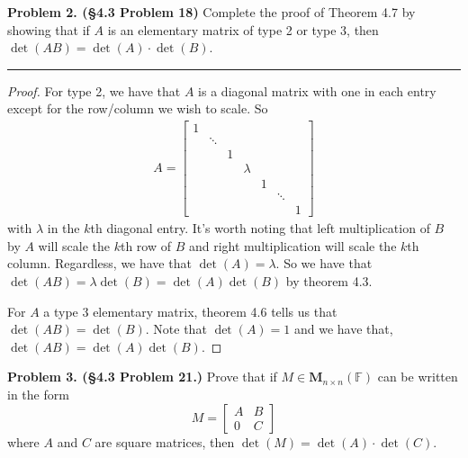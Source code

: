 \documentclass[leqno]{article}
\theoremstyle{nonumberplain}
\newtheorem{proof}{Proof}
\begin{document}
\pagebreak



\noindent\textbf{Problem 2. (\S 4.3 Problem 18)} Complete the proof of Theorem 4.7 by showing that if $A$ is an elementary matrix of type 2 or type 3, then $\det(AB)=\det(A)\cdot \det(B)$.

\noindent\rule[0.5ex]{\linewidth}{1pt}

\begin{proof}
For type 2, we have that $A$ is a diagonal matrix with one in each entry except for the row/column we wish to scale.  So 
\begin{align*}
A=\begin{bmatrix}
1 & & &\\
& \ddots & &\\
& & 1 & \\
& & & \lambda & &\\
& & & & 1 &\\
& & & & & \ddots &\\
& & & & & & 1
\end{bmatrix}
\end{align*}
with $\lambda$ in the $k$th diagonal entry. It's worth noting that left multiplication of $B$ by $A$ will scale the $k$th row of $B$ and right multiplication will scale the $k$th column.  Regardless, we have that $\det(A)=\lambda$.  So we have that $\det(AB)=\lambda \det(B)=\det(A)\det(B)$ by theorem 4.3.

For $A$ a type 3 elementary matrix, theorem 4.6 tells us that $\det(AB)=\det(B)$.  Note that $\det(A)=1$ and we have that, $\det(AB)=\det(A)\det(B)$.
\end{proof}

\pagebreak




\noindent\textbf{Problem 3. (\S 4.3 Problem 21.)} Prove that if $M\in \mathbf{M}_{n\times n}(\mathbb{F})$ can be written in the form 
\[
M=
\begin{bmatrix}
A & B\\
0 & C
\end{bmatrix}
\]
where $A$ and $C$ are square matrices, then $\det(M)=\det(A)\cdot \det(C)$.
\end{document}
